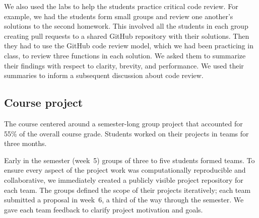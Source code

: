 We also used the labs to help the students practice critical code review.
For example, we had the students form small groups and review one another's
solutions to the second homework.
This involved all the students in each group creating pull requests to a
shared GitHub repository with their solutions.
Then they had to use the GitHub code review model, which we had been practicing
in class, to review three functions in each solution.
We asked them to summarize their findings with respect to
clarity, brevity, and performance.
We used their summaries to inform a subsequent discussion about code review.

\subsection{Course project}\label{project}

The course centered around a semester-long group project that accounted for 55\%
of the overall course grade.
Students worked on their projects in teams for three months.


Early in the semester (week~5) groups of three to five students formed teams.
To ensure every aspect of the project work was computationally
reproducible and collaborative, we immediately created a publicly visible
project repository for each team.
The groups defined the scope of their projects iteratively; each team
submitted a proposal in week~6, a third of the way through the semester. We
gave each team feedback to clarify project motivation and goals.


